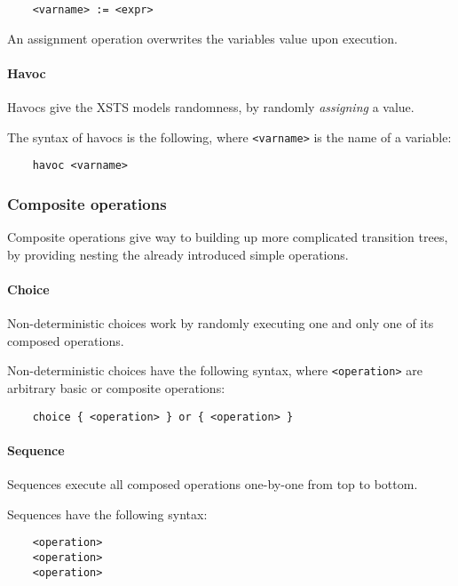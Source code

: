 \begin{Verbatim}
	<varname> := <expr>
\end{Verbatim}

An assignment operation overwrites the variables value upon execution.

\paragraph{Havoc}

Havocs give the XSTS models randomness, by randomly \emph{assigning} a value.

The syntax of havocs is the following, where \verb|<varname>| is the name of a variable:

\begin{Verbatim}
	havoc <varname>
\end{Verbatim}

\subsubsection{Composite operations}

Composite operations give way to building up more complicated transition trees, by providing nesting the already introduced simple operations.

\paragraph{Choice}

Non-deterministic choices work by randomly executing one and only one of its composed operations.

Non-deterministic choices have the following syntax, where \verb|<operation>| are arbitrary basic or composite operations:
 
\begin{Verbatim}
	choice { <operation> } or { <operation> }
\end{Verbatim}

\paragraph{Sequence}

Sequences execute all composed operations one-by-one from top to bottom.

Sequences have the following syntax:

\begin{Verbatim}
	<operation>
	<operation>
	<operation>
\end{Verbatim}

